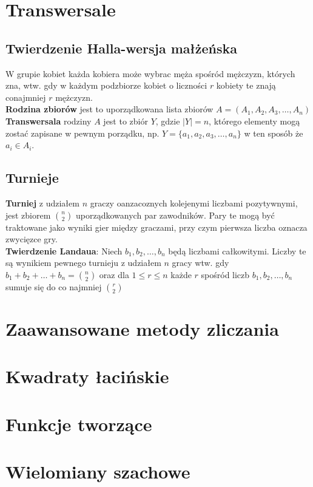 \documentclass[a4paper,12pt]{article}
\begin{document}
\section{Transwersale}
\subsection{Twierdzenie Halla-wersja małżeńska}W grupie kobiet każda kobiera może wybrac męża spośród mężczyzn, których zna, wtw. gdy w każdym podzbiorze kobiet o liczności $r$ kobiety te znają conajmniej $r$ mężczyzn.\\
\textbf{Rodzina zbiorów} jest to uporządkowana lista zbiorów $A=(A_1,A_2,A_3,\hdots,A_n)$\\
\textbf{Transwersala} rodziny $A$ jest to zbiór $Y$, gdzie $|Y|=n$, którego elementy mogą zostać zapisane w pewnym porządku, np. $Y=\{ a_1, a_2, a_3,\hdots, a_n\}$ w ten sposób że $a_i\in A_i$.
\subsection{Turnieje}
\textbf{Turniej} z udziałem $n$ graczy oanzacoznych kolejenymi liczbami pozytywnymi, jest zbiorem $n\choose2$ uporządkowanych par zawodników. Pary te mogą być traktowane jako wyniki gier między graczami, przy czym pierwsza liczba oznacza zwycięzce gry.\\
\textbf{Twierdzenie Landaua}: Niech $b_1, b_2,\hdots,b_n$ będą liczbami całkowitymi. Liczby te są wynikiem pewnego turnieju z udziałem $n$ gracy wtw. gdy $b_1+b_2+\hdots+b_n={n\choose2}$ oraz dla $1\leq r \leq n$ każde $r$ spośród liczb $b_1, b_2,\hdots,b_n$ sumuje się do co najmniej $r\choose2$
\section{Zaawansowane metody zliczania}
\section{Kwadraty łacińskie}
\section{Funkcje tworzące}
\section{Wielomiany szachowe}
\end{document}
